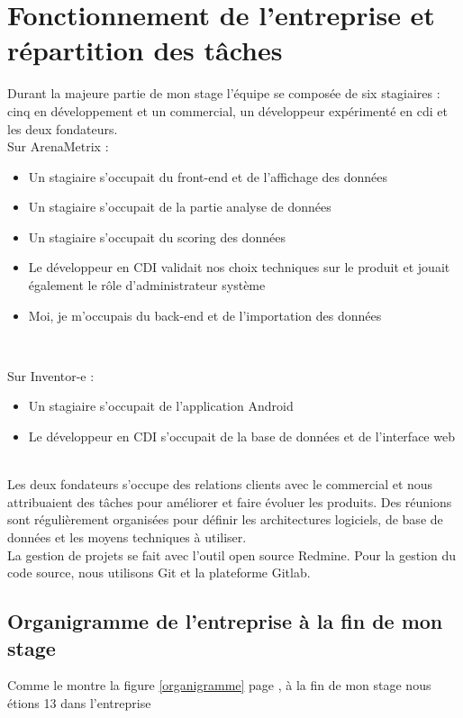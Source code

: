 \section{Fonctionnement de l'entreprise et répartition des tâches}
Durant la majeure partie de mon stage l'équipe se composée de six stagiaires : cinq en développement et un commercial, un développeur expérimenté en cdi et les deux fondateurs. \\

Sur ArenaMetrix : 
\begin{itemize}
  \item[\textbullet] Un stagiaire s'occupait du front-end et de l'affichage des données
  \item[\textbullet] Un stagiaire s'occupait de la partie analyse de données
  \item[\textbullet] Un stagiaire s'occupait du scoring des données
  \item[\textbullet] Le développeur en CDI validait nos choix techniques sur le produit et jouait également le rôle d'administrateur système
  \item[\textbullet]Moi, je m'occupais du back-end et de l'importation des données
\end{itemize} \

Sur Inventor-e : 
\begin{itemize}
  \item[\textbullet] Un stagiaire s'occupait de l'application Android
  \item[\textbullet] Le développeur en CDI s'occupait de la base de données et de l'interface web
\end{itemize}

\leavevmode
\\
Les deux fondateurs s'occupe des relations clients avec le commercial et nous attribuaient des tâches pour améliorer et faire évoluer les produits. Des réunions sont régulièrement organisées pour définir les architectures logiciels, de base de données et les moyens techniques à utiliser. 
\\ 

La gestion de projets se fait avec l'outil open source Redmine. Pour la gestion du code source, nous utilisons Git et la plateforme Gitlab.

\subsection{Organigramme de l'entreprise à la fin de mon stage}
Comme le montre la figure \ref{organigramme} page \pageref{organigramme}, à la fin de mon stage nous étions 13 dans l'entreprise


